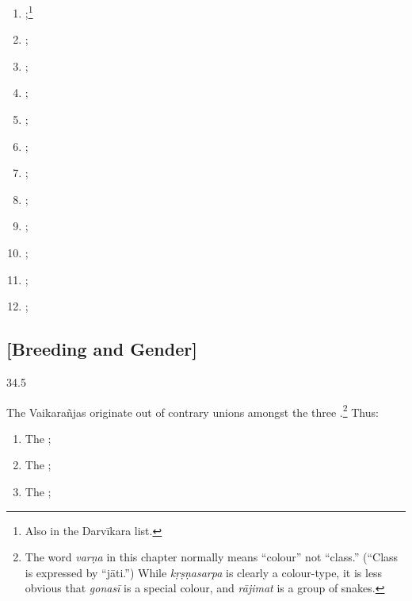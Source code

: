\begin{translation}
\begin{multicols}{2}
    \begin{enumerate}
        \raggedright
\item {};\footnote{Also in the Darvīkara 
    list.}  
    \item {}; 
    \item {};
    \item {}; 
    \item {}; 
    \item {}; 
    \item {};
    \item {}; 
    \item {}; 
    \item {}; 
    \item {}; 
    \item {};
    \end{enumerate}
\end{multicols}

\medskip

\subsection{[Breeding and Gender]}
\item[34.5]

The Vaikarañjas originate out of contrary unions amongst the three 
.\footnote{The word 
\emph{varṇa} in this chapter normally means “colour” not “class.”  (“Class is 
expressed by “jāti.”)  While \emph{kṛṣṇasarpa} is clearly a colour-type, it is less 
obvious that \emph{gonasī} is a special colour, and \emph{rājimat} is a group of 
snakes.}
    Thus:

    \begin{enumerate}
        \raggedright
\item The ; 
\item The ; 
\item The ; 
\end{enumerate}


\end{translation}
